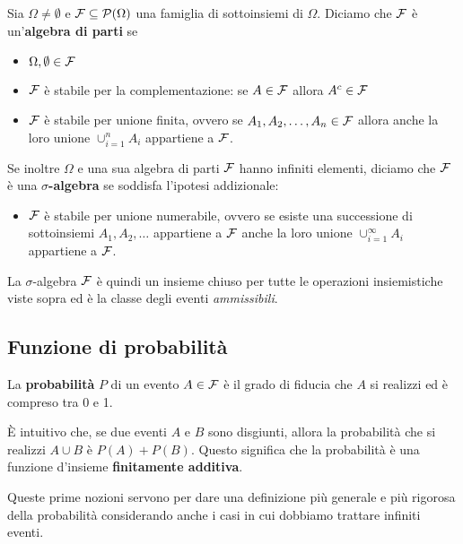 \begin{definition}
	Sia $\Omega \neq \emptyset$ e $\mathcal{F} \subseteq \mathcal{P}(\Omega)$ una famiglia di sottoinsiemi
	di $\Omega$. Diciamo che $\mathcal{F}$ è un'\textbf{algebra di parti} se
	\begin{itemize}
		\item $\Omega, \emptyset \in \mathcal{F}$
		\item $\mathcal{F}$ è stabile per la complementazione: se $A \in \mathcal{F}$ allora $A^c \in \mathcal{F}$
		\item $\mathcal{F}$ è stabile per unione finita, ovvero se $A_1, A_2, \dots, A_n \in \mathcal{F}$ allora
		      anche la loro unione $\cup_{i=1}^n A_i$ appartiene a $\mathcal{F}$.
	\end{itemize}
	Se inoltre $\Omega$ e una sua algebra di parti $\mathcal{F}$ hanno infiniti elementi, diciamo che $\mathcal{F}$
	è una $\sigma$\textbf{-algebra} se soddisfa l'ipotesi addizionale:
	\begin{itemize}
		\item $\mathcal{F}$ è stabile per unione numerabile, ovvero se esiste una successione di
		      sottoinsiemi $A_1, A_2, \dots$ appartiene a $\mathcal{F}$ anche la loro unione
		      $\cup_{i=1}^\infty A_i$ appartiene a $\mathcal{F}$.
	\end{itemize}
\end{definition}

La $\sigma$-algebra $\mathcal{F}$ è quindi un insieme chiuso per tutte le operazioni insiemistiche viste
sopra ed è la classe degli eventi \emph{ammissibili}.

\subsection{Funzione di probabilità}
La \textbf{probabilità} $P$ di un evento $A \in \mathcal{F}$ è il grado di fiducia che $A$ si realizzi ed è
compreso tra 0 e 1.

\`E intuitivo che, se due eventi $A$ e $B$ sono disgiunti, allora la probabilità che si realizzi
$A \cup B$ è $P(A) + P(B)$. Questo significa che la probabilità è una funzione d'insieme
\textbf{finitamente additiva}.

Queste prime nozioni servono per dare una definizione più generale e più rigorosa della probabilità
considerando anche i casi in cui dobbiamo trattare infiniti eventi.

